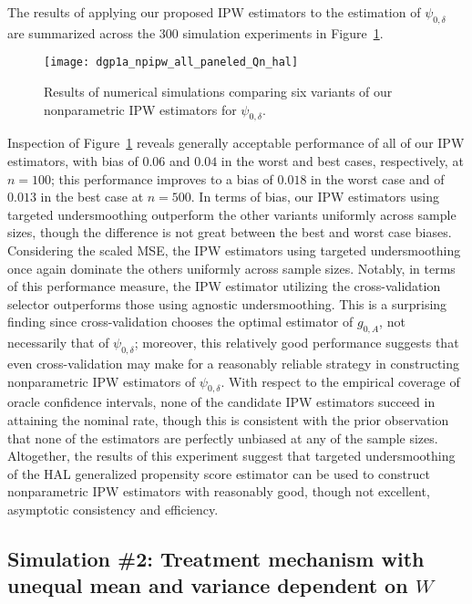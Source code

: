 The results of applying our proposed IPW estimators to the estimation of
$\psi_{0,\delta}$ are summarized across the $300$ simulation experiments in
Figure~\ref{fig:dgp1a_npipw}.
\begin{figure}[H]
  \centering
  \texttt{[image: dgp1a\_npipw\_all\_paneled\_Qn\_hal]}
  \caption{Results of numerical simulations comparing six variants of our
  nonparametric IPW estimators for $\psi_{0,\delta}$.}
  \label{fig:dgp1a_npipw}
\end{figure}
Inspection of Figure~\ref{fig:dgp1a_npipw} reveals generally acceptable
performance of all of our IPW estimators, with bias of $0.06$ and $0.04$ in the
worst and best cases, respectively, at $n=100$; this performance improves to a
bias of $0.018$ in the worst case and of $0.013$ in the best case at $n=500$. In
terms of bias, our IPW estimators using targeted undersmoothing outperform the
other variants uniformly across sample sizes, though the difference is not great
between the best and worst case biases. Considering the scaled MSE, the IPW
estimators using targeted undersmoothing once again dominate the others
uniformly across sample sizes. Notably, in terms of this performance measure,
the IPW estimator utilizing the cross-validation selector outperforms those
using agnostic undersmoothing. This is a surprising finding since
cross-validation chooses the optimal estimator of $g_{0,A}$, not necessarily
that of $\psi_{0,\delta}$; moreover, this relatively good performance suggests
that even cross-validation may make for a reasonably reliable strategy in
constructing nonparametric IPW estimators of $\psi_{0,\delta}$. With respect to
the empirical coverage of oracle confidence intervals, none of the candidate
IPW estimators succeed in attaining the nominal rate, though this is consistent
with the prior observation that none of the estimators are perfectly unbiased at
any of the sample sizes. Altogether, the results of this experiment suggest that
targeted undersmoothing of the HAL generalized propensity score estimator can be
used to construct nonparametric IPW estimators with reasonably good, though not
excellent, asymptotic consistency and efficiency.

\subsection{Simulation \#2: Treatment mechanism with unequal mean and variance
dependent on $W$}\label{hese_sim_norm}


